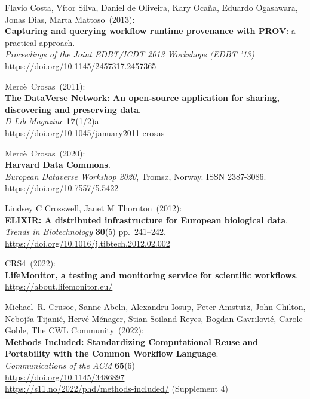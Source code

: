 \begin{thebibliography}{9}
Flavio Costa, Vítor Silva, Daniel de Oliveira, Kary Ocaña, Eduardo Ogasawara, Jonas Dias, Marta Mattoso~(2013): \\
\textbf{Capturing and querying workflow runtime provenance with PROV}: a practical approach.\\
\emph{Proceedings of the Joint EDBT/ICDT 2013 Workshops (EDBT '13)}\\
\url{https://doi.org/10.1145/2457317.2457365} 

Mercè~Crosas~(2011): \\
\textbf{The DataVerse Network: An open-source application for sharing,
discovering and preserving data}.\\
\emph{D-Lib Magazine} \textbf{17}(1/2)a\\
\url{https://doi.org/10.1045/january2011-crosas}

Mercè~Crosas~(2020): \\
\textbf{Harvard Data Commons}.\\
\emph{European Dataverse Workshop 2020}, Tromsø, Norway. ISSN
2387-3086.\\
\url{https://doi.org/10.7557/5.5422}

Lindsey C Crosswell, Janet M Thornton~(2012): \\
\textbf{ELIXIR: A distributed infrastructure for European biological
data}.\\
\emph{Trends in Biotechnology} \textbf{30}(5) pp.~241--242.\\
\url{https://doi.org/10.1016/j.tibtech.2012.02.002}

CRS4~(2022): \\
\textbf{LifeMonitor, a testing and monitoring service for scientific
workflows}.\\
\url{https://about.lifemonitor.eu/}

Michael~R. Crusoe, Sanne Abeln, Alexandru Iosup, Peter
Amstutz, John Chilton, Nebojša Tijanić, Hervé Ménager, Stian
Soiland-Reyes, Bogdan Gavrilović, Carole Goble, The CWL Community~(2022): \\
\textbf{Methods Included: Standardizing
Computational Reuse and Portability with the Common Workflow
Language}.\\
\emph{Communications of the ACM} \textbf{65}(6)\\
\url{https://doi.org/10.1145/3486897} \\
\url{https://s11.no/2022/phd/methods-included/} (Supplement 4)


\end{thebibliography}
